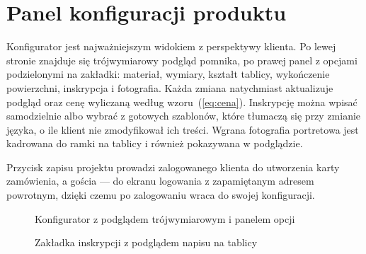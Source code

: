 \section{Panel konfiguracji produktu}
\label{sec:prez-konfigurator}

Konfigurator jest najważniejszym widokiem z perspektywy klienta. Po lewej stronie znajduje się trójwymiarowy podgląd pomnika, po prawej panel z opcjami podzielonymi na zakładki: materiał, wymiary, kształt tablicy, wykończenie powierzchni, inskrypcja i fotografia. Każda zmiana natychmiast aktualizuje podgląd oraz cenę wyliczaną według wzoru~(\ref{eq:cena}). Inskrypcję można wpisać samodzielnie albo wybrać z gotowych szablonów, które tłumaczą się przy zmianie języka, o ile klient nie zmodyfikował ich treści. Wgrana fotografia portretowa jest kadrowana do ramki na tablicy i również pokazywana w podglądzie.

Przycisk zapisu projektu prowadzi zalogowanego klienta do utworzenia karty zamówienia, a gościa — do ekranu logowania z zapamiętanym adresem powrotnym, dzięki czemu po zalogowaniu wraca do swojej konfiguracji.

\begin{figure}[htbp]
\centering
\caption{Konfigurator z podglądem trójwymiarowym i panelem opcji}
\label{fig:prez-konfigurator}
\end{figure}

\begin{figure}[htbp]
\centering
\caption{Zakładka inskrypcji z podglądem napisu na tablicy}
\label{fig:prez-konfigurator-inskrypcja}
\end{figure}
